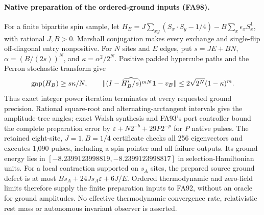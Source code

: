 \paragraph{Native preparation of the ordered-ground inputs (FA98).}
For a finite bipartite spin sample, let
$H_B=J\sum_{xy}(S_x\cdot S_y-1/4)-B\sum_x\epsilon_xS_x^1$,
with rational $J,B>0$. Marshall conjugation makes every exchange and
single-flip off-diagonal entry nonpositive. For $N$ sites and $E$ edges,
put $s=JE+BN$, $\alpha=(B/(2s))^N$, and
$\kappa=\alpha^2/2^N$. Positive padded hypercube paths and the Perron
stochastic transform give
\[
 \operatorname{gap}(H_B)\ge s\kappa/N,\qquad
 \|\widehat{(I-H'_B/s)^{mN}{\bf1}}-v_B\|
 \le2\sqrt{2^N}(1-\kappa)^m.
\]
Thus exact integer power iteration terminates at every requested ground
precision. Rational square-root and alternating-arctangent intervals give
the amplitude-tree angles; exact Walsh synthesis and FA93's port controller
bound the complete preparation error by
$\varepsilon+N2^{-b}+29P2^{-p}$ for $P$ native pulses.
The retained eight-site, $J=1,B=1/4$ certificate checks all 256 eigenvectors
and executes 1,090 pulses, including a spin pointer and all failure outputs.
Its ground energy lies in
$[-8.2399123998819,-8.2399123998817]$ in selection-Hamiltonian units.
For a local contraction supported on $s_A$ sites, the prepared source
ground defect is at most
$Bs_A+24Js_A\varepsilon+6J/E$.
Ordered thermodynamic and zero-field limits therefore supply the finite
preparation inputs to FA92, without an oracle for ground amplitudes.
No effective thermodynamic convergence rate, relativistic rest mass or
autonomous invariant observer is asserted.
